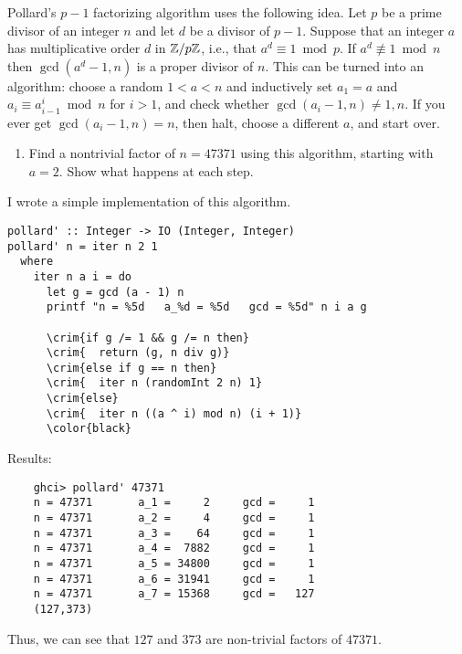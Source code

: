 
\begin{problem}
Pollard's $p-1$ factorizing algorithm uses the following idea.  Let
$p$ be a prime divisor of an integer $n$ and let $d$ be a divisor of
$p-1$.  Suppose that an integer $a$ has multiplicative order $d$ in
$\mathbb{Z}/p\mathbb{Z}$, i.e., that $a^d \equiv 1 \bmod p$.  If
$a^d \not\equiv 1 \bmod n$ then $\gcd(a^d-1,n)$ is a proper divisor of
$n$.  This can be turned into an algorithm: choose a random $1 < a
< n$ and inductively set $a_1=a$ and $a_i \equiv a_{i-1}^i \bmod n$ for
$i > 1$, and check whether $\gcd(a_i-1,n) \neq 1,n$.  If you ever
get $\gcd(a_i-1,n)=n$, then halt, choose a different $a$, and start over.
\begin{enumerate} \renewcommand{\itemsep}{3mm}
\item Find a nontrivial factor of $n=47371$ using this algorithm,
starting with $a=2$.  Show what happens at each step.
\end{enumerate}

\begin{Answer}
  I wrote a simple implementation of this algorithm.
  \color{zaffre}
  \begin{Verbatim}[commandchars=\\\{\}]
pollard' :: Integer -> IO (Integer, Integer)
pollard' n = iter n 2 1
  where
    iter n a i = do
      let g = gcd (a - 1) n
      printf "n = %5d   a_%d = %5d   gcd = %5d" n i a g

      \crim{if g /= 1 && g /= n then}
      \crim{  return (g, n div g)}
      \crim{else if g == n then}
      \crim{  iter n (randomInt 2 n) 1}
      \crim{else}
      \crim{  iter n ((a ^ i) mod n) (i + 1)}
      \color{black}
  \end{Verbatim}
  \color{black}

  \noindent
  Results:

  \begin{Verbatim}
    ghci> pollard' 47371
    n = 47371       a_1 =     2     gcd =     1
    n = 47371       a_2 =     4     gcd =     1
    n = 47371       a_3 =    64     gcd =     1
    n = 47371       a_4 =  7882     gcd =     1
    n = 47371       a_5 = 34800     gcd =     1
    n = 47371       a_6 = 31941     gcd =     1
    n = 47371       a_7 = 15368     gcd =   127
    (127,373)
  \end{Verbatim}

  Thus, we can see that $127$ and $373$ are non-trivial factors of $47371$.


\end{Answer}


\end{problem}
